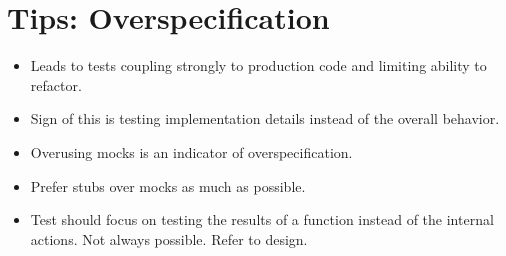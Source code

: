 \documentclass{article}
\begin{document}
\sloppy
\section{Tips: Overspecification}
\begin{itemize}
    \item Leads to tests coupling strongly to production code and limiting
        ability to refactor.
    \item Sign of this is testing implementation details instead of the overall
        behavior.
    \item Overusing mocks is an indicator of overspecification.
    \item Prefer stubs over mocks as much as possible.
    \item Test should focus on testing the results of a function instead of the
        internal actions. Not always possible. Refer to design.
\end{itemize}
\end{document}
